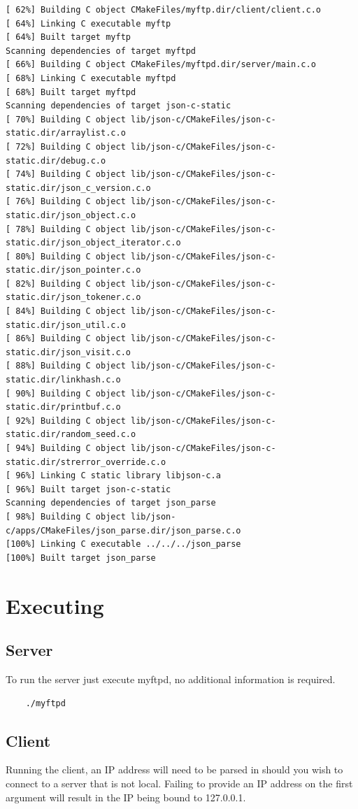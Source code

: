 \documentclass{article}
\begin{document}
\begin{lstlisting}
[ 62%] Building C object CMakeFiles/myftp.dir/client/client.c.o
[ 64%] Linking C executable myftp
[ 64%] Built target myftp
Scanning dependencies of target myftpd
[ 66%] Building C object CMakeFiles/myftpd.dir/server/main.c.o
[ 68%] Linking C executable myftpd
[ 68%] Built target myftpd
Scanning dependencies of target json-c-static
[ 70%] Building C object lib/json-c/CMakeFiles/json-c-static.dir/arraylist.c.o
[ 72%] Building C object lib/json-c/CMakeFiles/json-c-static.dir/debug.c.o
[ 74%] Building C object lib/json-c/CMakeFiles/json-c-static.dir/json_c_version.c.o
[ 76%] Building C object lib/json-c/CMakeFiles/json-c-static.dir/json_object.c.o
[ 78%] Building C object lib/json-c/CMakeFiles/json-c-static.dir/json_object_iterator.c.o
[ 80%] Building C object lib/json-c/CMakeFiles/json-c-static.dir/json_pointer.c.o
[ 82%] Building C object lib/json-c/CMakeFiles/json-c-static.dir/json_tokener.c.o
[ 84%] Building C object lib/json-c/CMakeFiles/json-c-static.dir/json_util.c.o
[ 86%] Building C object lib/json-c/CMakeFiles/json-c-static.dir/json_visit.c.o
[ 88%] Building C object lib/json-c/CMakeFiles/json-c-static.dir/linkhash.c.o
[ 90%] Building C object lib/json-c/CMakeFiles/json-c-static.dir/printbuf.c.o
[ 92%] Building C object lib/json-c/CMakeFiles/json-c-static.dir/random_seed.c.o
[ 94%] Building C object lib/json-c/CMakeFiles/json-c-static.dir/strerror_override.c.o
[ 96%] Linking C static library libjson-c.a
[ 96%] Built target json-c-static
Scanning dependencies of target json_parse
[ 98%] Building C object lib/json-c/apps/CMakeFiles/json_parse.dir/json_parse.c.o
[100%] Linking C executable ../../../json_parse
[100%] Built target json_parse    
\end{lstlisting}


\section{Executing}
\subsection{Server}
To run the server just execute myftpd, no additional information is required.
\begin{lstlisting}
    ./myftpd
\end{lstlisting}
\subsection{Client}
Running the client, an IP address will need to be parsed in should you wish to connect to a server that is not local. Failing to provide an IP address on the first argument will result in the IP being bound to 127.0.0.1. 
\end{document}
